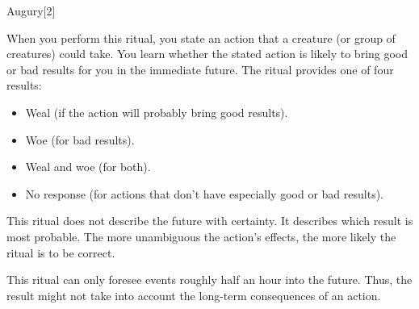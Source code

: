 \begin{spellsection}{Augury}[2]
    \begin{spellheader}
    \end{spellheader}
    \begin{spellcontent}
        \begin{spelltargetinginfo}
        \end{spelltargetinginfo}
        \begin{spelleffects}
            \spellspecial When you perform this ritual, you state an action that a creature (or group of creatures) could take.
            \spelleffect You learn whether the stated action is likely to bring good or bad results for you in the immediate future. The ritual provides one of four results:
            \begin{itemize}
                \item Weal (if the action will probably bring good results).
                \item Woe (for bad results).
                \item Weal and woe (for both).
                \item No response (for actions that don't have especially good or bad results).
            \end{itemize}

            This ritual does not describe the future with certainty. It describes which result is most probable. The more unambiguous the action's effects, the more likely the ritual is to be correct.
        \end{spelleffects}
    \end{spellcontent}
    \begin{spellfooter}
        \spellnotes This ritual can only foresee events roughly half an hour into the future. Thus, the result might not take into account the long-term consequences of an action.
    \end{spellfooter}
    \begin{spellaugments}
    \end{spellaugments}
\end{spellsection}

